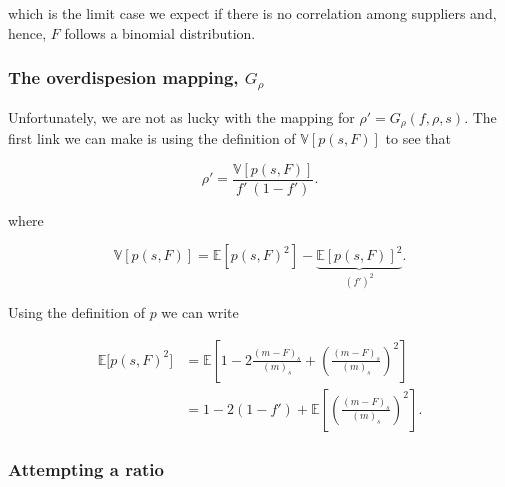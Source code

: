 \documentclass[american, abstract=on]{scrartcl}
\newcommand{\E}{\mathbb{E}}
\newcommand{\V}{\mathbb{V}}
\begin{document}
which is the limit case we expect if there is no correlation among suppliers and, hence, $F$ follows a binomial distribution.

\subsubsection{The overdispesion mapping, $G_\rho$}

Unfortunately, we are not as lucky with the mapping for $\rho' = G_{\rho}(f, \rho, s)$. The first link we can make is using the definition of $\V[p(s, F)]$ to see that

\begin{equation}
    \rho' = \frac{\V[p(s, F)]}{f' \ (1 - f')}.
\end{equation}

where

\begin{equation}
    \V[p(s, F)] = \E[p(s, F)^2] - \underbrace{\E[p(s, F)]^2}_{\left(f'\right)^2}.
\end{equation}

Using the definition of $p$ we can write

\begin{equation}
    \begin{split}
        \E\big[ p(s, F)^2 \big] &= \E\left[1 - 2 \frac{(m - F)_s}{(m)_s} + \left(\frac{(m - F)_s}{(m)_s}  \right)^2\right] \\
        &= 1 - 2(1 - f') + \E\left[ \left(\frac{(m - F)_s}{(m)_s}  \right)^2 \right].
    \end{split}
\end{equation}

\subsubsection{Attempting a ratio }
\end{document}

